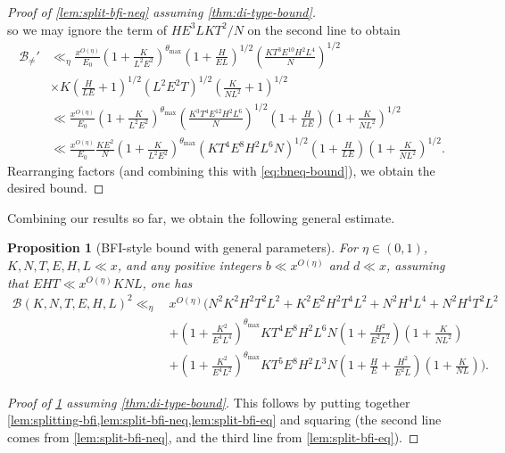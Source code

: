 \documentclass[reqno,11pt]{amsart}
\newtheorem{proposition}[theorem]{Proposition}
\theoremstyle{definition}
\theoremstyle{remark}
\numberwithin{equation}{section}
\newcommand{\mB}{\mathcal{B}}
\begin{document}
\begin{proof}[Proof of \cref{lem:split-bfi-neq} assuming \cref{thm:di-type-bound}]
\[\]
so we may ignore the term of $HE^3LKT^2/N$ on the second line to obtain
\[
\begin{aligned}
    \mB_{\neq}' &\ll_\eta \frac{x^{O(\eta)}}{E_0}
    \left(1 + \frac{K}{L^2 E^2}\right)^{\theta_{\max}}
    \left(1 + \frac{H}{EL}\right)^{1/2} 
    \left(\frac{KT^3 E^{10} H^2 L^4}{N}\right)^{1/2}
    \\
    &\times
    K \left(\frac{H}{LE} + 1\right)^{1/2} \left(L^2 E^2 T\right)^{1/2} \left(\frac{K}{NL^2} + 1\right)^{1/2}
    \\
    &\ll \frac{x^{O(\eta)}}{E_0} 
    \left(1 + \frac{K}{L^2 E^2}\right)^{\theta_{\max}}
    \left(\frac{K^3 T^4 E^{12} H^2 L^6}{N}\right)^{1/2}
    \left(1 + \frac{H}{LE}\right) \left(1 + \frac{K}{NL^2}\right)^{1/2}
    \\
    &\ll \frac{x^{O(\eta)}}{E_0} \frac{KE^2}{N} 
    \left(1 + \frac{K}{L^2 E^2}\right)^{\theta_{\max}}
    \left(K T^4 E^8 H^2 L^6 N\right)^{1/2}
    \left(1 + \frac{H}{LE}\right) \left(1 + \frac{K}{NL^2}\right)^{1/2}.
\end{aligned}
\]
Rearranging factors (and combining this with \cref{eq:bneq-bound}), we obtain the desired bound.
\end{proof}


Combining our results so far, we obtain the following general estimate.

\begin{proposition}[BFI-style bound with general parameters] \label{prop:bfi-expo-2}
For $\eta \in (0, 1)$, $K, N, T, E, H, L \ll x$, and any positive integers $b \ll x^{O(\eta)}$ and $d \ll x$, assuming that $EHT \ll x^{O(\eta)} KNL$, one has
\[
\begin{aligned}
    \mB(K, N, T, E, H, L)^2 \ll_\eta\,
    &x^{O(\eta)} \Bigg( N^2 K^2 H^2 T^2 L^2 + K^2 E^2 H^2 T^4 L^2 + N^2 H^4 L^4 + N^2 H^4 T^2 L^2
    \\
    &+ \left(1 + \frac{K^2}{E^4 L^4}\right)^{\theta_{\max}}
    K T^4 E^8 H^2 L^6 N
    \left(1 + \frac{H^2}{E^2L^2}\right) \left(1 + \frac{K}{NL^2}\right)
    \\
    &+
    \left(1 + \frac{K^2}{E^4L^2}\right)^{\theta_{\max}}
    K T^5 E^8 H^2 L^3 N
    \left(1 + \frac{H}{E} + \frac{H^2}{E^2L}\right) \left(1 + \frac{K}{NL} \right)
    \Bigg).
\end{aligned}
\]
\end{proposition}

\begin{proof}[Proof of \cref{prop:bfi-expo-2} assuming \cref{thm:di-type-bound}]
This follows by putting together \cref{lem:splitting-bfi,lem:split-bfi-neq,lem:split-bfi-eq} and squaring (the second line comes from \cref{lem:split-bfi-neq}, and the third line from \cref{lem:split-bfi-eq}).
\end{proof}
\end{document}
